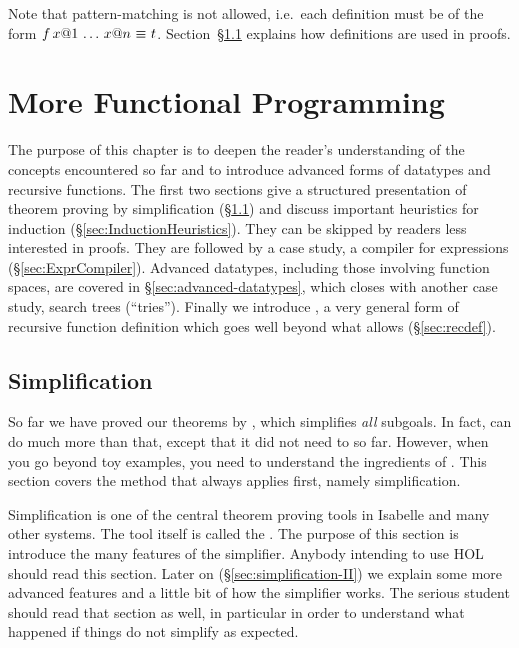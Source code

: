 Note that pattern-matching is not allowed, i.e.\ each definition must be of
the form $f\,x@1\,\dots\,x@n~\emph{$\equiv$}~t$.
Section~{\S}\ref{sec:Simplification} explains how definitions are used
in proofs.




\chapter{More Functional Programming}

The purpose of this chapter is to deepen the reader's understanding of the
concepts encountered so far and to introduce advanced forms of datatypes and
recursive functions. The first two sections give a structured presentation of
theorem proving by simplification ({\S}\ref{sec:Simplification}) and discuss
important heuristics for induction ({\S}\ref{sec:InductionHeuristics}). They can
be skipped by readers less interested in proofs. They are followed by a case
study, a compiler for expressions ({\S}\ref{sec:ExprCompiler}). Advanced
datatypes, including those involving function spaces, are covered in
{\S}\ref{sec:advanced-datatypes}, which closes with another case study, search
trees (``tries'').  Finally we introduce , a very general
form of recursive function definition which goes well beyond what
 allows ({\S}\ref{sec:recdef}).


\section{Simplification}
\label{sec:Simplification}

So far we have proved our theorems by , which simplifies
\emph{all} subgoals. In fact,  can do much more than that, except
that it did not need to so far. However, when you go beyond toy examples, you
need to understand the ingredients of .  This section covers the
method that  always applies first, namely simplification.

Simplification is one of the central theorem proving tools in Isabelle and
many other systems. The tool itself is called the . The
purpose of this section is introduce the many features of the simplifier.
Anybody intending to use HOL should read this section. Later on
({\S}\ref{sec:simplification-II}) we explain some more advanced features and a
little bit of how the simplifier works. The serious student should read that
section as well, in particular in order to understand what happened if things
do not simplify as expected.


